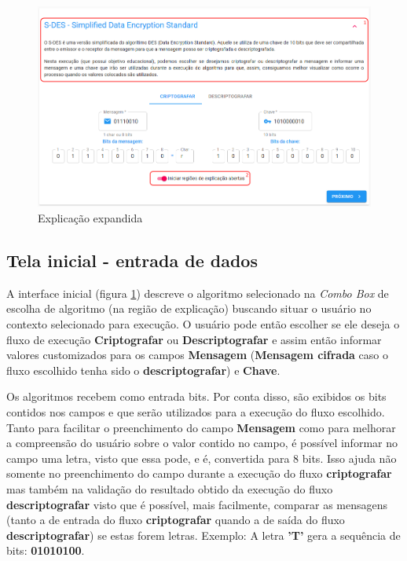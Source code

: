 \begin{figure}[H]
    \centering
    \caption{Explicação expandida}
    \label{fig:uimainopen}
    \includegraphics[width=1\linewidth]{UI/UIMainOpen.png}
\end{figure}

\subsection{Tela inicial - entrada de dados}

A interface inicial (figura \ref{fig:uimainopen}) descreve o algoritmo selecionado na \textit{Combo Box} de escolha de algoritmo (na região de explicação) buscando situar o usuário no contexto selecionado para execução. O usuário pode então escolher se ele deseja o fluxo de execução \textbf{Criptografar} ou \textbf{Descriptografar} e assim então informar valores customizados para os campos \textbf{Mensagem} (\textbf{Mensagem cifrada} caso o fluxo escolhido tenha sido o \textbf{descriptografar}) e \textbf{Chave}.

Os algoritmos recebem como entrada bits. Por conta disso, são exibidos os bits contidos nos campos e que serão utilizados para a execução do fluxo escolhido. Tanto para facilitar o preenchimento do campo \textbf{Mensagem} como para melhorar a compreensão do usuário sobre o valor contido no campo, é possível informar no campo uma letra, visto que essa pode, e é, convertida para 8 bits. Isso ajuda não somente no preenchimento do campo durante a execução do fluxo \textbf{criptografar} mas também na validação do resultado obtido da execução do fluxo \textbf{descriptografar} visto que é possível, mais facilmente, comparar as mensagens (tanto a de entrada do fluxo \textbf{criptografar} quando a de saída do fluxo \textbf{descriptografar}) se estas forem letras. Exemplo: A letra \textbf{'T'} gera a sequência de bits: \textbf{01010100}.


